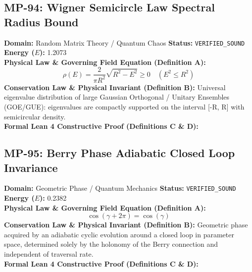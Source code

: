 \subsection{MP-94: Wigner Semicircle Law Spectral Radius Bound}
\textbf{Domain:} Random Matrix Theory / Quantum Chaos \hfill \textbf{Status:} \texttt{VERIFIED\_SOUND} \hfill \textbf{Energy ($E$):} 1.2073\\
\textbf{Physical Law \& Governing Field Equation (Definition A):}
\begin{equation*}
\rho(E) = \frac{2}{\pi R^2}\sqrt{R^2 - E^2} \ge 0 \quad (E^2 \le R^2)
\end{equation*}
\textbf{Conservation Law \& Physical Invariant (Definition B):}
Universal eigenvalue distribution of large Gaussian Orthogonal / Unitary Ensembles (GOE/GUE): eigenvalues are compactly supported on the interval [-R, R] with semicircular density.\\

\textbf{Formal Lean 4 Constructive Proof (Definitions C \& D):}


\vspace{1em}
\subsection{MP-95: Berry Phase Adiabatic Closed Loop Invariance}
\textbf{Domain:} Geometric Phase / Quantum Mechanics \hfill \textbf{Status:} \texttt{VERIFIED\_SOUND} \hfill \textbf{Energy ($E$):} 0.2382\\
\textbf{Physical Law \& Governing Field Equation (Definition A):}
\begin{equation*}
\cos(\gamma + 2\pi) = \cos(\gamma)
\end{equation*}
\textbf{Conservation Law \& Physical Invariant (Definition B):}
Geometric phase acquired by an adiabatic cyclic evolution around a closed loop in parameter space, determined solely by the holonomy of the Berry connection and independent of traversal rate.\\

\textbf{Formal Lean 4 Constructive Proof (Definitions C \& D):}


\vspace{1em}
